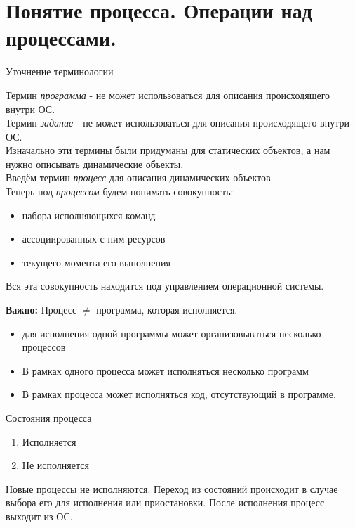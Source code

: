 \documentclass[12pt, a4paper]{article}
\begin{document}
    \section{Понятие процесса. Операции над процессами.}
    \begin{center}
        Уточнение терминологии
    \end{center}
    Термин \textit{программа} - не может использоваться для описания происходящего внутри ОС.\\
    Термин \textit{задание} - не может использоваться для описания происходящего внутри ОС.\\
    Изначально эти термины были придуманы для статических объектов, а нам нужно описывать динамические 
    объекты.\\
    Введём термин \textit{процесс} для описания динамических объектов.\\
    Теперь под \textit{процессом} будем понимать совокупность:
    \begin{itemize}
        \item набора исполняющихся команд
        \item ассоциированных с ним ресурсов 
        \item текущего момента его выполнения
    \end{itemize} 
      Вся эта совокупность находится под управлением операционной системы.\par
    \textbf{Важно:} Процесс $\neq$ программа, которая исполняется.
    \begin{itemize}
        \item для исполнения одной программы может организовываться несколько процессов 
        \item В рамках одного процесса может исполняться несколько программ 
        \item В рамках процесса может исполняться код, отсутствующий в программе.
    \end{itemize}
    \begin{center}
        Состояния процесса
    \end{center}
    \begin{enumerate}
        \item Исполняется 
        \item Не исполняется
    \end{enumerate}
    Новые процессы не исполняются. Переход из состояний происходит в случае 
    выбора его для исполнения или приостановки. После исполнения процесс выходит из ОС.\par
\end{document}
